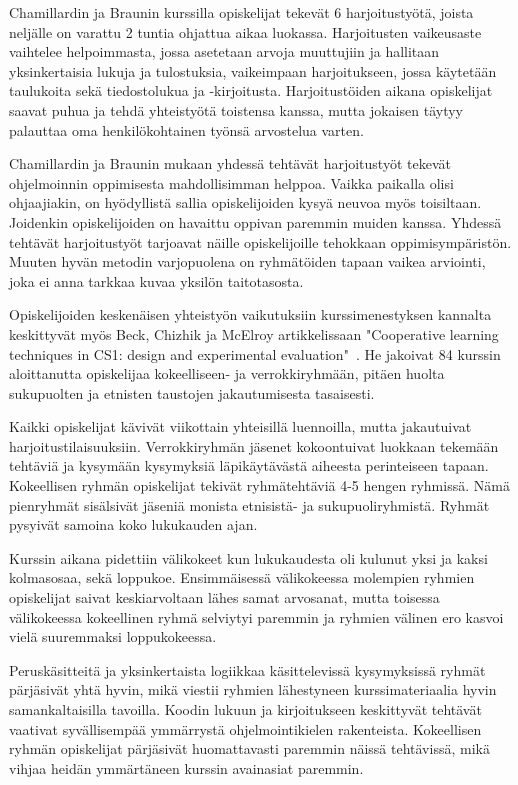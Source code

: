 \documentclass[finnish]{../tktltiki2}
\theoremstyle{definition}
\theoremstyle{remark}
\begin{document}
Chamillardin ja Braunin kurssilla opiskelijat tekevät 6 harjoitustyötä, joista neljälle on varattu 2 tuntia ohjattua aikaa luokassa. Harjoitusten vaikeusaste vaihtelee helpoimmasta, jossa asetetaan arvoja muuttujiin ja hallitaan yksinkertaisia lukuja ja tulostuksia, vaikeimpaan harjoitukseen, jossa käytetään taulukoita sekä tiedostolukua ja -kirjoitusta. Harjoitustöiden aikana opiskelijat saavat puhua ja tehdä yhteistyötä toistensa kanssa, mutta jokaisen täytyy palauttaa oma henkilökohtainen työnsä arvostelua varten.

Chamillardin ja Braunin mukaan yhdessä tehtävät harjoitustyöt tekevät ohjelmoinnin oppimisesta mahdollisimman helppoa. Vaikka paikalla olisi ohjaajiakin, on hyödyllistä sallia opiskelijoiden kysyä neuvoa myös toisiltaan. Joidenkin opiskelijoiden on havaittu oppivan paremmin muiden kanssa. Yhdessä tehtävät harjoitustyöt tarjoavat näille opiskelijoille tehokkaan oppimisympäristön. Muuten hyvän metodin varjopuolena on ryhmätöiden tapaan vaikea arviointi, joka ei anna tarkkaa kuvaa yksilön taitotasosta.

Opiskelijoiden keskenäisen yhteistyön vaikutuksiin kurssimenestyksen kannalta keskittyvät myös Beck, Chizhik ja McElroy artikkelissaan "Cooperative learning techniques in CS1: design and experimental evaluation"~\cite{BCM05}. He jakoivat 84 kurssin aloittanutta opiskelijaa kokeelliseen- ja verrokkiryhmään, pitäen huolta sukupuolten ja etnisten taustojen jakautumisesta tasaisesti.

Kaikki opiskelijat kävivät viikottain yhteisillä luennoilla, mutta jakautuivat harjoitustilaisuuksiin. Verrokkiryhmän jäsenet kokoontuivat luokkaan tekemään tehtäviä ja kysymään kysymyksiä läpikäytävästä aiheesta perinteiseen tapaan. Kokeellisen ryhmän opiskelijat tekivät ryhmätehtäviä 4-5 hengen ryhmissä. Nämä pienryhmät sisälsivät jäseniä monista etnisistä- ja sukupuoliryhmistä. Ryhmät pysyivät samoina koko lukukauden ajan.

Kurssin aikana pidettiin välikokeet kun lukukaudesta oli kulunut yksi ja kaksi kolmasosaa, sekä loppukoe. Ensimmäisessä välikokeessa molempien ryhmien opiskelijat saivat keskiarvoltaan lähes samat arvosanat, mutta toisessa välikokeessa kokeellinen ryhmä selviytyi paremmin ja ryhmien välinen ero kasvoi vielä suuremmaksi loppukokeessa.

Peruskäsitteitä ja yksinkertaista logiikkaa käsittelevissä kysymyksissä ryhmät pärjäsivät yhtä hyvin, mikä viestii ryhmien lähestyneen kurssimateriaalia hyvin samankaltaisilla tavoilla. Koodin lukuun ja kirjoitukseen keskittyvät tehtävät vaativat syvällisempää ymmärrystä ohjelmointikielen rakenteista. Kokeellisen ryhmän opiskelijat pärjäsivät huomattavasti paremmin näissä tehtävissä, mikä vihjaa heidän ymmärtäneen kurssin avainasiat paremmin.
\end{document}
